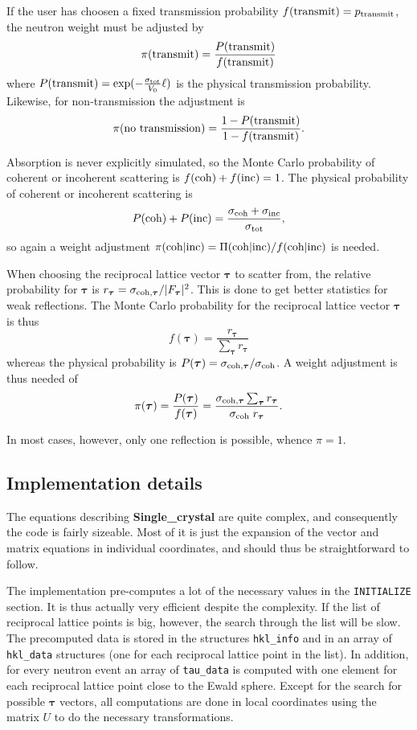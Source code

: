 If the user has choosen a fixed transmission probability $f({\rm
  transmit}) = p_{\rm transmit}$, the neutron weight must be adjusted by
$$ \pi({\rm transmit}) = \frac{P({\rm transmit})}{f({\rm transmit})}
$$
where $P({\rm transmit}) = \exp(-\frac{\sigma_{\rm tot}}{V_0}\ell)$ is
the physical transmission probability. Likewise, for non-transmission
the adjustment is
$$ \pi({\rm no~transmission}) = \frac{1-P({\rm transmit})}{1-f({\rm transmit})}.
$$

Absorption is never explicitly simulated, so the Monte Carlo probability
of coherent or incoherent scattering is
$f({\rm coh})+f({\rm inc}) = 1$.
The physical probability of coherent or incoherent scattering is
$$ P({\rm coh})+P({\rm inc}) = \frac{\sigma_{\rm coh} + \sigma_{\rm
    inc}}{\sigma_{\rm tot}}, $$
so again a weight adjustment $\pi({\rm coh}|{\rm inc}) = \Pi({\rm
    coh}|{\rm inc})/f({\rm coh}|{\rm inc})$ is needed.

When choosing the reciprocal lattice vector $\boldsymbol{\tau}$ to
scatter from, the relative probability for $\boldsymbol{\tau}$ is
$r_{\boldsymbol{\tau}} = \sigma_{{\rm
    coh},\boldsymbol{\tau}}/|F_{\boldsymbol{\tau}}|^2$. This is done to
get better statistics for weak reflections. The Monte Carlo probability
for the reciprocal lattice vector $\boldsymbol{\tau}$ is thus
$$ f(\boldsymbol{\tau}) =
\frac{r_{\boldsymbol{\tau}}}{\sum_{\boldsymbol{\tau}} r_{\boldsymbol{\tau}}}
$$
whereas the physical probability is $P(\boldsymbol{\tau}) = \sigma_{{\rm
    coh},\boldsymbol{\tau}}/\sigma_{\rm coh}$. A weight adjustment is
thus needed of
$$
\pi(\boldsymbol{\tau}) =
 \frac{P(\boldsymbol{\tau})}{f(\boldsymbol{\tau})} =
 \frac{\sigma_{{\rm coh},\boldsymbol{\tau}}
  \sum_{\boldsymbol{\tau}} r_{\boldsymbol{\tau}}}
 {\sigma_{\rm coh} \; r_{\boldsymbol{\tau}}}.$$

In most cases, however, only one reflection is possible, whence $\pi=1$.

\subsection{Implementation details}
\label{s:Single_crystal_implement}

The equations describing {\bf Single\_crystal} are quite
complex, and consequently the code is fairly sizeable. Most of it is
just the expansion of the vector and matrix equations in individual
coordinates, and should thus be straightforward to follow.

The implementation pre-computes a lot of the necessary values in the
\texttt{INITIALIZE} section. It is thus actually very efficient despite
the complexity. If the list of reciprocal lattice points is big,
however, the search through the list will be slow. The precomputed data
is stored in the structures \texttt{hkl\_info} and in an array of
\texttt{hkl\_data} structures (one for each reciprocal lattice point in
the list). In addition, for every neutron event an array of
\texttt{tau\_data} is computed with one element for each reciprocal
lattice point close to the Ewald sphere. Except for the search for
possible $\boldsymbol{\tau}$ vectors, all computations are done in local
coordinates using the matrix $U$ to do the necessary transformations.

